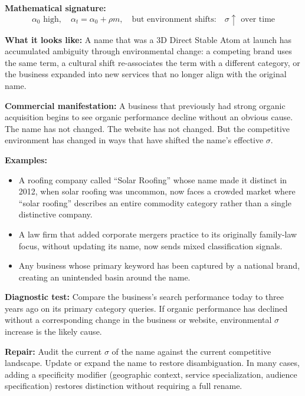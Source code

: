\documentclass[12pt, openany]{book}
\theoremstyle{thmstyle}
\theoremstyle{defstyle}
\begin{document}
\begin{failbox}
\textbf{Mathematical signature:}
\[
\alpha_0 \text{ high}, \quad \alpha_t = \alpha_0 + \rho m, \quad \text{but environment shifts:} \quad \sigma \uparrow \text{ over time}
\]

\textbf{What it looks like:} A name that was a 3D Direct Stable Atom at launch has accumulated ambiguity through environmental change: a competing brand uses the same term, a cultural shift re-associates the term with a different category, or the business expanded into new services that no longer align with the original name.

\textbf{Commercial manifestation:} A business that previously had strong organic acquisition begins to see organic performance decline without an obvious cause. The name has not changed. The website has not changed. But the competitive environment has changed in ways that have shifted the name's effective $\sigma$.

\textbf{Examples:}
\begin{itemize}[leftmargin=1.5em]
  \item A roofing company called ``Solar Roofing'' whose name made it distinct in 2012, when solar roofing was uncommon, now faces a crowded market where ``solar roofing'' describes an entire commodity category rather than a single distinctive company.
  \item A law firm that added corporate mergers practice to its originally family-law focus, without updating its name, now sends mixed classification signals.
  \item Any business whose primary keyword has been captured by a national brand, creating an unintended basin around the name.
\end{itemize}

\textbf{Diagnostic test:} Compare the business's search performance today to three years ago on its primary category queries. If organic performance has declined without a corresponding change in the business or website, environmental $\sigma$ increase is the likely cause.

\textbf{Repair:} Audit the current $\sigma$ of the name against the current competitive landscape. Update or expand the name to restore disambiguation. In many cases, adding a specificity modifier (geographic context, service specialization, audience specification) restores distinction without requiring a full rename.
\end{failbox}
\end{document}
